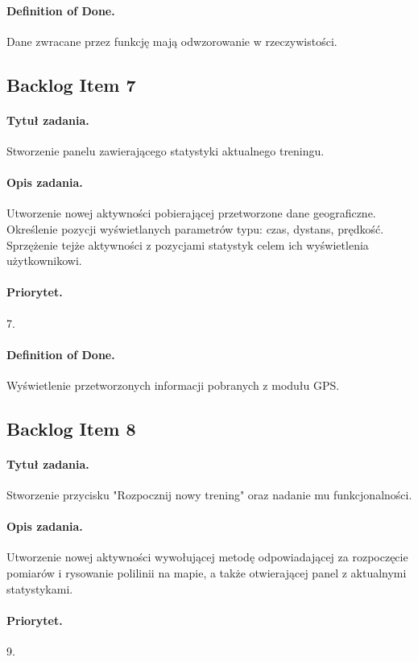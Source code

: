 \documentclass[a4paper]{article}
\begin{document}
\paragraph{Definition of Done.} Dane zwracane przez funkcję mają odwzorowanie w rzeczywistości.

\subsection{Backlog Item 7}
\paragraph{Tytuł zadania.} Stworzenie panelu zawierającego statystyki aktualnego treningu.
\paragraph{Opis zadania.} Utworzenie nowej aktywności pobierającej przetworzone dane geograficzne. Określenie pozycji wyświetlanych parametrów typu: czas, dystans, prędkość. Sprzężenie tejże aktywności z pozycjami statystyk celem ich wyświetlenia użytkownikowi.
\paragraph{Priorytet.} 7.
\paragraph{Definition of Done.} Wyświetlenie przetworzonych informacji pobranych z modułu GPS.

\subsection{Backlog Item 8}
\paragraph{Tytuł zadania.} Stworzenie przycisku "Rozpocznij nowy trening" oraz nadanie mu funkcjonalności.
\paragraph{Opis zadania.} Utworzenie nowej aktywności wywołującej metodę odpowiadającej za rozpoczęcie pomiarów i rysowanie polilinii na mapie, a także otwierającej panel z aktualnymi statystykami.
\paragraph{Priorytet.} 9.
\end{document}
